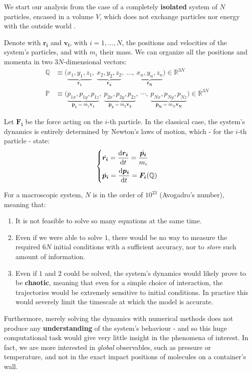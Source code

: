 \documentclass[../../main.tex]{subfiles}
\begin{document}
\medskip

We start our analysis from the case of a completely \textbf{isolated} system of $N$ particles, encased in a volume $V$, which does not exchange particles nor energy with the outside world \cite[Chapter~3]{sethna}.

Denote with $\bm{r_i}$ and $\bm{v_i}$, with $i=1, \dots, N$, the positions and velocities of the system's particles, and with $m_i$ their mass. We can organize all the positions and momenta in two $3N$-dimensional vectors:
\begin{align*}
    \mathbb{Q} &\equiv \Big( \underbrace{x_1, y_1, z_1}_{\bm{r_1}},\> \underbrace{x_2, y_2, z_2}_{\bm{r_2}},\> \dots,\> \underbrace{x_n, y_n, z_n}_{\bm{r_N}}   \Big) \in \mathbb{R}^{3N}\\
    \mathbb{P} &\equiv \Big(\underbrace{p_{1x}, p_{1y}, p_{1z}}_{\bm{p_1}=m_1 \bm{v_1}},\> \underbrace{p_{2x}, p_{2y}, p_{2z}}_{\bm{p_2} = m_2 \bm{v_2}}, \>\cdots,\> \underbrace{p_{Nx}, p_{Ny}, p_{Nz}}_{\bm{p_N} = m_N \bm{v_N}} \Big) \in \mathbb{R}^{3N}
\end{align*}


Let $\bm{F_i}$ be the force acting on the $i$-th particle. In the classical case, the system's dynamics is entirely determined by Newton's laws of motion, which - for the $i$-th particle - state:
\begin{align}\label{eqn:equations}
    \begin{dcases}
        \dot{\bm{r_i}} = \dv{\bm{r_i}}{t} = \frac{\dot{\bm{p_i}}}{m_i}\\ 
        \dot{\bm{p_i}} = \dv{\bm{p_i}}{t} = \bm{F_i}(\mathbb{Q})
    \end{dcases}
\end{align}

For a macroscopic system, $N$ is in the order of $10^{23}$ (Avogadro's number), meaning that:
\begin{enumerate}
    \item It is not feasible to solve so many equations at the same time. 
    \item Even if we were able to solve $1$, there would be no way to measure the required $6N$ initial conditions with a sufficient accuracy, nor to \textit{store} such amount of information.
    \item Even if $1$ and $2$ could be solved, the system's dynamics would likely
prove to be \textbf{chaotic}, meaning that even for a simple choice of interaction, the trajectories would be extremely sensitive to initial conditions. In practice this would severely limit the timescale at which the model is accurate.
\end{enumerate}
Furthermore, merely solving the dynamics with numerical methods does not produce any \textbf{understanding} of the system's behaviour - and so this huge computational task would give very little insight in the phenomena of interest.
In fact, we are more interested in \textit{global} observables, such as pressure or temperature, and not in the exact impact positions of molecules on a container's wall.
\end{document}

